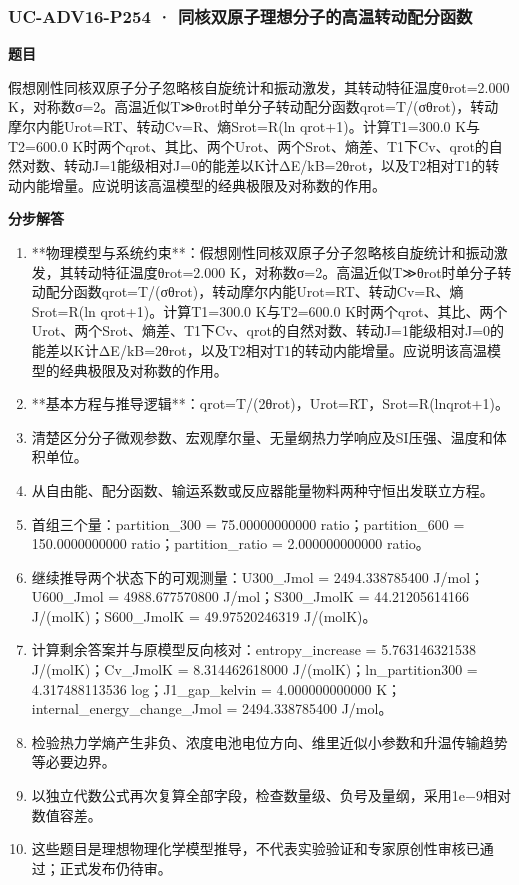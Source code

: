 \documentclass[UTF8,11pt,a4paper]{ctexart}
\begin{document}
\subsubsection*{UC-ADV16-P254 · 同核双原子理想分子的高温转动配分函数}
\noindent\textbf{题目}\par
假想刚性同核双原子分子忽略核自旋统计和振动激发，其转动特征温度θrot=2.000 K，对称数σ=2。高温近似T≫θrot时单分子转动配分函数qrot=T/(σθrot)，转动摩尔内能Urot=RT、转动Cv=R、熵Srot=R(ln qrot+1)。计算T1=300.0 K与T2=600.0 K时两个qrot、其比、两个Urot、两个Srot、熵差、T1下Cv、qrot的自然对数、转动J=1能级相对J=0的能差以K计ΔE/kB=2θrot，以及T2相对T1的转动内能增量。应说明该高温模型的经典极限及对称数的作用。\par
\medskip\noindent\textbf{分步解答}
\begin{enumerate}
\item **物理模型与系统约束**：假想刚性同核双原子分子忽略核自旋统计和振动激发，其转动特征温度θrot=2.000 K，对称数σ=2。高温近似T≫θrot时单分子转动配分函数qrot=T/(σθrot)，转动摩尔内能Urot=RT、转动Cv=R、熵Srot=R(ln qrot+1)。计算T1=300.0 K与T2=600.0 K时两个qrot、其比、两个Urot、两个Srot、熵差、T1下Cv、qrot的自然对数、转动J=1能级相对J=0的能差以K计ΔE/kB=2θrot，以及T2相对T1的转动内能增量。应说明该高温模型的经典极限及对称数的作用。
\item **基本方程与推导逻辑**：qrot=T/(2θrot)，Urot=RT，Srot=R(lnqrot+1)。
\item 清楚区分分子微观参数、宏观摩尔量、无量纲热力学响应及SI压强、温度和体积单位。
\item 从自由能、配分函数、输运系数或反应器能量物料两种守恒出发联立方程。
\item 首组三个量：partition\_300 = 75.00000000000 ratio；partition\_600 = 150.0000000000 ratio；partition\_ratio = 2.000000000000 ratio。
\item 继续推导两个状态下的可观测量：U300\_Jmol = 2494.338785400 J/mol；U600\_Jmol = 4988.677570800 J/mol；S300\_JmolK = 44.21205614166 J/(molK)；S600\_JmolK = 49.97520246319 J/(molK)。
\item 计算剩余答案并与原模型反向核对：entropy\_increase = 5.763146321538 J/(molK)；Cv\_JmolK = 8.314462618000 J/(molK)；ln\_partition300 = 4.317488113536 log；J1\_gap\_kelvin = 4.000000000000 K；internal\_energy\_change\_Jmol = 2494.338785400 J/mol。
\item 检验热力学熵产生非负、浓度电池电位方向、维里近似小参数和升温传输趋势等必要边界。
\item 以独立代数公式再次复算全部字段，检查数量级、负号及量纲，采用1e−9相对数值容差。
\item 这些题目是理想物理化学模型推导，不代表实验验证和专家原创性审核已通过；正式发布仍待审。
\end{enumerate}
\end{document}
